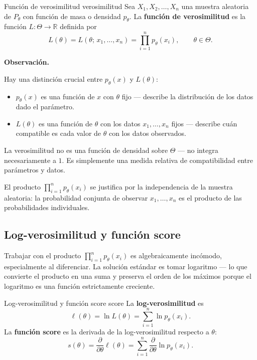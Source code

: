 \documentclass[12pt, a4paper]{book}
\newenvironment{observacion}{%
    \par\medskip\noindent\textbf{\color{azul}Observaci\'{o}n.}\enspace\itshape
}{\par\medskip}
\numberwithin{equation}{chapter}
\begin{document}
\begin{definicion}{Funci\'{o}n de verosimilitud}
	{verosimilitud}
	Sea $X_1, X_2, \ldots, X_n$ una muestra aleatoria de
	$P_\theta$ con funci\'{o}n de masa o densidad
	$p_\theta$. La \textbf{funci\'{o}n de verosimilitud}
	es la funci\'{o}n $L: \Theta \to \mathbb{R}$ definida
	por
	\[
	L(\theta) = L(\theta;\, x_1, \ldots, x_n)
	= \prod_{i=1}^{n} p_\theta(x_i),
	\qquad \theta \in \Theta.
	\]
\end{definicion}

\begin{observacion}
	Hay una distinci\'{o}n crucial entre $p_\theta(x)$ y
	$L(\theta)$:
	\begin{itemize}[leftmargin=2em]
		\item $p_\theta(x)$ es una funci\'{o}n de $x$ con
		$\theta$ fijo --- describe la distribuci\'{o}n de
		los datos dado el par\'{a}metro.
		\item $L(\theta)$ es una funci\'{o}n de $\theta$
		con los datos $x_1, \ldots, x_n$ fijos ---
		describe cu\'{a}n compatible es cada valor de
		$\theta$ con los datos observados.
	\end{itemize}
	La verosimilitud no es una funci\'{o}n de densidad
	sobre $\Theta$ --- no integra necesariamente a $1$.
	Es simplemente una medida relativa de compatibilidad
	entre par\'{a}metros y datos.
	
	El producto $\prod_{i=1}^n p_\theta(x_i)$ se justifica
	por la independencia de la muestra aleatoria: la
	probabilidad conjunta de observar $x_1, \ldots, x_n$
	es el producto de las probabilidades individuales.
\end{observacion}

\subsection{Log-verosimilitud y funci\'{o}n score}

Trabajar con el producto $\prod_{i=1}^n p_\theta(x_i)$
es algebraicamente inc\'{o}modo, especialmente al
diferenciar. La soluci\'{o}n est\'{a}ndar es tomar
logaritmo --- lo que convierte el producto en una suma
y preserva el orden de los m\'{a}ximos porque el logaritmo
es una funci\'{o}n estrictamente creciente.

\begin{definicion}{Log-verosimilitud y funci\'{o}n score}
	{score}
	La \textbf{log-verosimilitud} es
	\[
	\ell(\theta) = \ln L(\theta)
	= \sum_{i=1}^{n} \ln p_\theta(x_i).
	\]
	La \textbf{funci\'{o}n score} es la derivada de la
	log-verosimilitud respecto a $\theta$:
	\[
	s(\theta) = \frac{\partial}{\partial\theta}
	\ell(\theta)
	= \sum_{i=1}^{n} \frac{\partial}{\partial\theta}
	\ln p_\theta(x_i).
	\]
\end{definicion}
\end{document}
